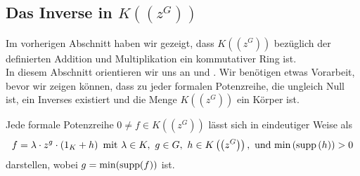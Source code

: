 \subsection{Das Inverse in $K\left(\left(z^{G}\right)\right)$ }
%
%
%
%
%
Im vorherigen Abschnitt haben wir gezeigt, dass $K\left(\left(z^{G}\right)\right)$ bezüglich der definierten Addition und Multiplikation ein kommutativer Ring ist. \\
In diesem Abschnitt orientieren wir uns an \cite[S. 196- 198]{fuchs66} und \cite[S. 210- 213]{neumann49}.
Wir benötigen etwas Vorarbeit, bevor wir zeigen können, dass zu jeder formalen Potenzreihe, die ungleich Null ist, ein Inverses existiert und die Menge  $K\left(\left(z^{G}\right)\right)$ ein Körper ist.
% 
%
%
%
%
%
\begin{satz}\label{JedePotenzreihesoDarstellbar}
Jede formale Potenzreihe $0 \neq f \in K\left(\left(z^{G}\right)\right)$ lässt sich in eindeutiger Weise als  \\
\[f = \lambda\cdot z^g\cdot \left(1_K + h\right)\text{ mit } \lambda \in K, ~g \in G,~h \in K\left(\left(z^{G}\right)\right), \text{ und } \textup{min}\left(\textup{supp}\left(h\right)\right) > 0 \] darstellen, wobei $g= \min(\textup{supp}(f))$ ist.
\end{satz}
%
%
